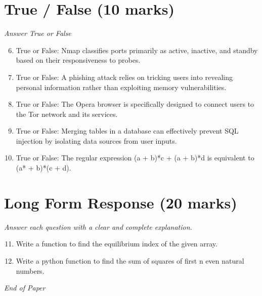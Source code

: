 \documentclass[12pt]{article}
\begin{document}
\section*{True / False (10 marks)}
\textit{Answer True or False}
\begin{enumerate}[label=\arabic*.]
\setcounter{enumi}{5}
\item True or False: Nmap classifies ports primarily as active, inactive, and standby based on their responsiveness to probes.
\item True or False: A phishing attack relies on tricking users into revealing personal information rather than exploiting memory vulnerabilities.
\item True or False: The Opera browser is specifically designed to connect users to the Tor network and its services.
\item True or False: Merging tables in a database can effectively prevent SQL injection by isolating data sources from user inputs.
\item True or False: The regular expression (a + b)*c + (a + b)*d is equivalent to (a* + b)*(c + d).
\end{enumerate}

\section*{Long Form Response (20 marks)}
\textit{Answer each question with a clear and complete explanation.}
\begin{enumerate}[label=\arabic*.]
\setcounter{enumi}{10}
\item Write a function to find the equilibrium index of the given array.
\item Write a python function to find the sum of squares of first n even natural numbers.
\end{enumerate}

\vfill
\noindent\textit{End of Paper}
\end{document}
